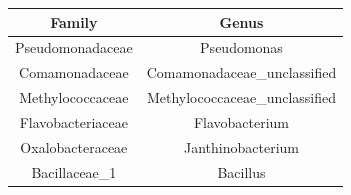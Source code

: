 \documentclass[]{article}
\begin{document}
\begin{longtable}[]{@{}cc@{}}
\toprule
\begin{minipage}[b]{0.44\columnwidth}\centering\strut
Family\strut
\end{minipage} & \begin{minipage}[b]{0.44\columnwidth}\centering\strut
Genus\strut
\end{minipage}\tabularnewline
\midrule
\endhead
\begin{minipage}[t]{0.44\columnwidth}\centering\strut
Pseudomonadaceae\strut
\end{minipage} & \begin{minipage}[t]{0.44\columnwidth}\centering\strut
Pseudomonas\strut
\end{minipage}\tabularnewline
\begin{minipage}[t]{0.44\columnwidth}\centering\strut
Comamonadaceae\strut
\end{minipage} & \begin{minipage}[t]{0.44\columnwidth}\centering\strut
Comamonadaceae\_unclassified\strut
\end{minipage}\tabularnewline
\begin{minipage}[t]{0.44\columnwidth}\centering\strut
Methylococcaceae\strut
\end{minipage} & \begin{minipage}[t]{0.44\columnwidth}\centering\strut
Methylococcaceae\_unclassified\strut
\end{minipage}\tabularnewline
\begin{minipage}[t]{0.44\columnwidth}\centering\strut
Flavobacteriaceae\strut
\end{minipage} & \begin{minipage}[t]{0.44\columnwidth}\centering\strut
Flavobacterium\strut
\end{minipage}\tabularnewline
\begin{minipage}[t]{0.44\columnwidth}\centering\strut
Oxalobacteraceae\strut
\end{minipage} & \begin{minipage}[t]{0.44\columnwidth}\centering\strut
Janthinobacterium\strut
\end{minipage}\tabularnewline
\begin{minipage}[t]{0.44\columnwidth}\centering\strut
Bacillaceae\_1\strut
\end{minipage} & \begin{minipage}[t]{0.44\columnwidth}\centering\strut
Bacillus\strut
\end{minipage}\tabularnewline

\end{longtable}
\end{document}
